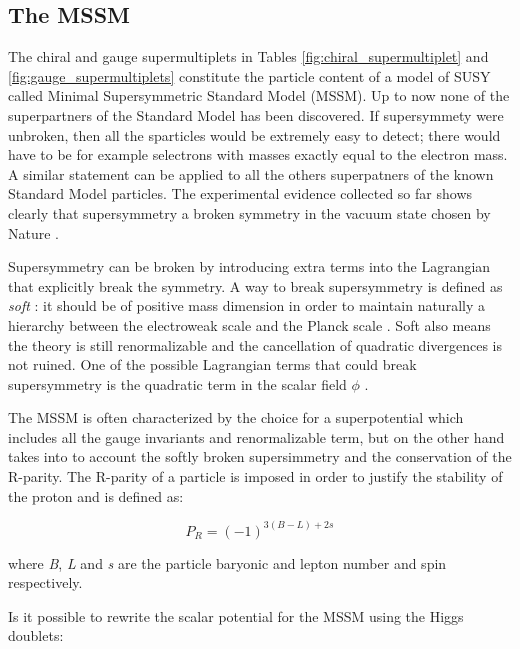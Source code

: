 \FloatBarrier

\subsection{The MSSM}

\FloatBarrier

The chiral and gauge supermultiplets in Tables \ref{fig:chiral_supermultiplet} and \ref{fig:gauge_supermultiplets} constitute the particle content of a model of SUSY called Minimal Supersymmetric Standard Model (MSSM). Up to now none of the superpartners of the Standard Model has been discovered. If supersymmety were unbroken, then all the sparticles would be extremely easy to detect; there would have to be for example selectrons with masses exactly equal to the electron mass. A similar statement can be applied to all the others superpatners of the known Standard Model particles. The experimental evidence collected so far shows clearly that supersymmetry a broken symmetry in the vacuum state chosen by Nature \cite{Martin:1997ns}.

Supersymmetry can be broken by introducing extra terms into the Lagrangian that explicitly break the symmetry. A way to break supersymmetry is defined as \textit{soft} \cite{Dimopoulos:1981zb}: it should be of positive mass dimension in order to maintain naturally a hierarchy between the electroweak scale and the Planck scale \cite{Martin:1997ns}. Soft also means the theory is still renormalizable and the cancellation of quadratic divergences is not ruined. One of the possible Lagrangian terms that could break supersymmetry is the quadratic term in the scalar field $\phi$ \cite{Martin:1997ns}.

The MSSM is often characterized by the choice for a superpotential which includes all the gauge invariants and renormalizable term, but on the other hand takes into to account the softly broken supersimmetry and the conservation of the R-parity. The R-parity of a particle is imposed in order to justify the stability of the proton \cite{Martin:1997ns} and is defined as:

\begin{equation}
P_{R} = (-1)^{3(B-L)+2s}
\end{equation}

where \textit{B}, \textit{L} and \textit{s} are the particle baryonic and lepton number and spin respectively. 

Is it possible to rewrite the scalar potential for the MSSM using the Higgs doublets\cite{Martin:1997ns}:

